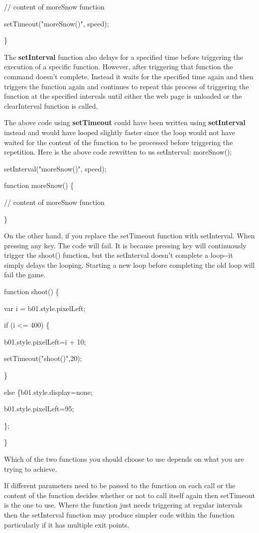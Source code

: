 \documentclass[
]{article}
\begin{document}
// content of moreSnow function

setTimeout("moreSnow()", speed);

\}

The \textbf{setInterval} function also delays for a specified time
before triggering the execution of a specific function. However, after
triggering that function the command doesn't complete. Instead it waits
for the specified time again and then triggers the function again and
continues to repeat this process of triggering the function at the
specified intervals until either the web page is unloaded or the
clearInterval function is called.

The above code using \textbf{setTimeout} could have been written using
\textbf{setInterval} instead and would have looped slightly faster since
the loop would not have waited for the content of the function to be
processed before triggering the repetition. Here is the above code
rewritten to us setInterval: moreSnow();

setInterval("moreSnow()", speed);

function moreSnow() \{

// content of moreSnow function

\}

On the other hand, if you replace the setTimeout function with
setInterval. When pressing any key. The code will fail. It is because
pressing key will continuously trigger the shoot() function, but the
setInterval doesn't complete a loop-\/-it simply delays the looping.
Starting a new loop before completing the old loop will fail the game.

function shoot() \{

var i = b01.style.pixelLeft;

if (i \textless= 400) \{

b01.style.pixelLeft=i + 10;

setTimeout("shoot()",20);

\}

else \{b01.style.display=\textquotesingle none\textquotesingle;

b01.style.pixelLeft=95;

\};

\}

Which of the two functions you should choose to use depends on what you
are trying to achieve.

If different parameters need to be passed to the function on each call
or the content of the function decides whether or not to call itself
again then setTimeout is the one to use. Where the function just needs
triggering at regular intervals then the setInterval function may
produce simpler code within the function particularly if it has multiple
exit points.
\end{document}
